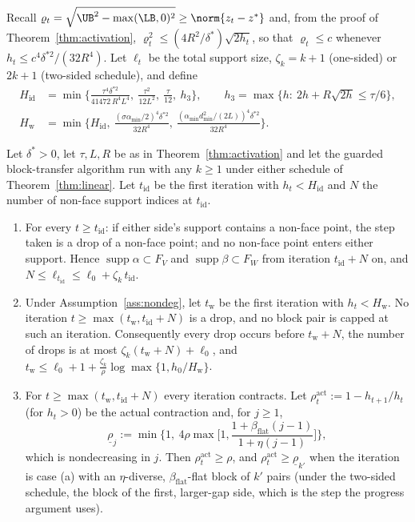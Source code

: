 Recall $\varrho_t=\sqrt{\UB^2-\max(\LB,0)^2}\ge\norm{z_t-z^*}$ and, from the
proof of Theorem~\ref{thm:activation}, $\varrho_t^2\le(4R^2/\delta^*)\sqrt{2h_t}$,
so that $\varrho_t\le c$ whenever $h_t\le c^4\delta^{*2}/(32R^4)$. Let
$\ell_t$ be the total support size, $\zeta_k=k+1$ (one-sided) or $2k+1$
(two-sided schedule), and define
\begin{align*}
H_{\mathrm{id}}&=\min\Big\{\frac{\tau^4\delta^{*2}}{41472\,R^4L^4},\ \frac{\tau^2}{12L^2},\ \frac{\tau}{12},\ h_3\Big\},\qquad
h_3=\max\{h:\ 2h+R\sqrt{2h}\le\tau/6\},\\
H_{\mathrm w}&=\min\Big\{H_{\mathrm{id}},\ \frac{(\sigma\alpha_{\min}/2)^4\delta^{*2}}{32R^4},\
\frac{(\alpha_{\min}d_{\min}^2/(2L))^4\delta^{*2}}{32R^4}\Big\}.
\end{align*}

\begin{theorem}[Identification and drop count]\label{thm:ident}
Let $\delta^*>0$, let $\tau,L,R$ be as in Theorem~\ref{thm:activation}
and let the guarded block-transfer algorithm run with any $k\ge1$ under
either schedule of Theorem~\ref{thm:linear}. Let $t_{\mathrm{id}}$ be the
first iteration with $h_t<H_{\mathrm{id}}$ and $N$ the number of
non-face support indices at $t_{\mathrm{id}}$.
\begin{enumerate}\setlength\itemsep{0pt}
\item[(i)] For every $t\ge t_{\mathrm{id}}$: if either side's support
contains a non-face point, the step taken is a drop of a non-face point;
and no non-face point enters either support. Hence
$\operatorname{supp}\alpha\subset F_V$ and $\operatorname{supp}\beta\subset F_W$
from iteration $t_{\mathrm{id}}+N$ on, and
$N\le \ell_{t_{\mathrm{id}}}\le \ell_0+\zeta_k\,t_{\mathrm{id}}$.
\item[(ii)] Under Assumption~\ref{ass:nondeg}, let $t_{\mathrm w}$ be the
first iteration with $h_t<H_{\mathrm w}$. No iteration
$t\ge\max(t_{\mathrm w},t_{\mathrm{id}}+N)$ is a drop, and no block pair
is capped at such an iteration. Consequently every drop occurs before
$t_{\mathrm w}+N$, the number of drops is at most
$\zeta_k(t_{\mathrm w}+N)+\ell_0$, and
$t_{\mathrm w}\le \ell_0+1+\tfrac{\zeta_k}{\rho}\log\max\{1,h_0/H_{\mathrm w}\}$.
\item[(iii)] For $t\ge\max(t_{\mathrm w},t_{\mathrm{id}}+N)$ every
iteration contracts. Let $\rho^{\mathrm{act}}_t:=1-h_{t+1}/h_t$ (for
$h_t>0$) be the actual contraction and, for $j\ge1$,
\[
\underline\rho_j:=\min\Big\{1,\ 4\rho\max\Big[1,\frac{1+\beta_{\mathrm{flat}}(j-1)}{1+\eta(j-1)}\Big]\Big\},
\]
which is nondecreasing in $j$. Then $\rho^{\mathrm{act}}_t\ge\rho$, and
$\rho^{\mathrm{act}}_t\ge\underline\rho_{k'}$ when the iteration is case
(a) with an $\eta$-diverse, $\beta_{\mathrm{flat}}$-flat block of $k'$
pairs (under the two-sided schedule, the block of the first,
larger-gap side, which is the step the progress argument uses).
\end{enumerate}
\end{theorem}

